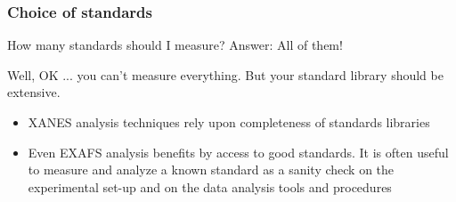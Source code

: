 \documentclass[10pt, xcolor=x11names, compress]{beamer}
\begin{document}
\begin{frame}
  \frametitle{Choice of standards}

  \begin{alertblock}{How many standards should I measure?}
    Answer: All of them!
  \end{alertblock}

  \bigskip

  Well, OK ... you can't measure everything.  But your standard
  library should be extensive.
  \begin{itemize}
  \item XANES analysis techniques rely upon completeness of standards
    libraries
  \item Even EXAFS analysis benefits by access to good standards.  It
    is often useful to measure and analyze a known standard as a
    sanity check on the experimental set-up and on the data analysis
    tools and procedures
  \end{itemize}
\end{frame}
\end{document}
